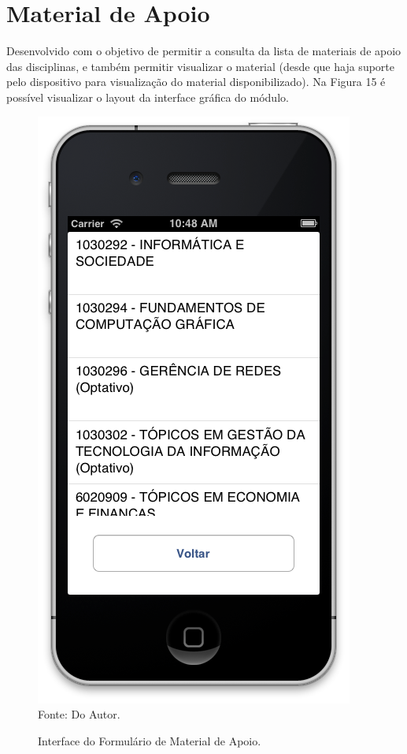 \section{Material de Apoio}
Desenvolvido com o objetivo de permitir a consulta da lista de materiais de apoio das disciplinas, e também permitir visualizar o material (desde que haja suporte pelo dispositivo para visualização do material disponibilizado). Na Figura 15 é possível visualizar o layout da interface gráfica do módulo.

\begin{figure}[!htb]
     \centering
     \caption[Formulário Material de Apoio - Interface]{Interface do Formulário de Material de Apoio.}
     \includegraphics[scale=0.34]{imagens/formmaterialapoio.png}
     \\  Fonte: Do Autor.
\end{figure}

